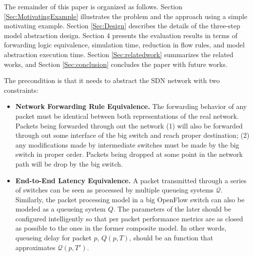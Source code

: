 The remainder of this paper is organized as follows. Section  \ref{Sec:MotivatingExample} illustrates the problem and the approach using a simple motivating example.
Section \ref{Sec:Design} describes the details of the three-step model abstraction design.
Section 4 presents the evaluation results in terms of forwarding logic equivalence, simulation time, reduction in flow rules, and model abstraction execution time.
Section \ref{Sec:relatedwork} summarizes the related works, and Section \ref{Sec:conclusion} concludes the paper with future works.


The precondition is that it needs to abstract the SDN network with two constraints:
\begin{itemize}
\item \textbf{Network Forwarding Rule Equivalence.}
        The forwarding behavior of any packet must be identical
        between both representations of the real network. Packets being
        forwarded through out the network (1) will also be forwarded through out
        some interface of the big switch and reach proper destination;
        (2) any modifications made by intermediate switches must be made by the
        big switch in proper order.
        Packets being dropped at some point in the network path will be drop by the
        big switch.
\item \textbf{End-to-End Latency Equivalence.}
        A packet transmitted through a series of
        switches can be seen as processed by multiple queueing systems $\mathcal{Q}$.
        Similarly, the packet processing model in a big OpenFlow switch can
        also be modeled as a queueing system $Q$.
        The parameters of the later should be configured intelligently
        so that per packet performance metrics are as closed as possible to the ones
        in the former composite model.
        In other words, queueing delay for packet $p$, $Q(p, T)$, should be an
        function that approximates $\mathcal{Q}(p, T')$.
\end{itemize}
\fi
